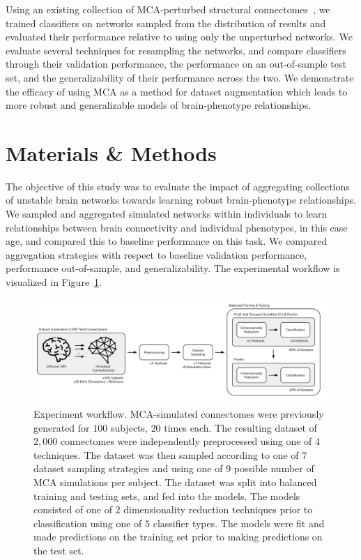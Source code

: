 \documentclass[num-refs]{nbdt-article}
\begin{document}
Using an existing collection of MCA-perturbed structural connectomes~\cite{Kiar2020-yz}, we trained classifiers on networks sampled from the distribution of results and evaluated their performance relative to using only the unperturbed networks. We evaluate several techniques for resampling the networks, and compare classifiers through their validation performance, the performance on an out-of-sample test set, and the generalizability of their performance across the two. We demonstrate the efficacy of using MCA as a method for dataset augmentation which leads to more robust and generalizable models of brain-phenotype relationships.

\section{Materials \& Methods}
The objective of this study was to evaluate the impact of aggregating collections of unstable brain networks towards learning robust brain-phenotype relationships. We sampled and aggregated simulated networks within individuals to learn relationships between brain connectivity and individual phenotypes, in this case age, and compared this to baseline performance on this task. We compared aggregation strategies with respect to baseline validation performance, performance out-of-sample, and generalizability. The experimental workflow is visualized in Figure~\ref{fig:workflow}.

\begin{figure}[bth!]\centering
\includegraphics[width=\linewidth]{figures/0.pdf}
\caption{Experiment workflow. MCA-simulated connectomes were previously generated for $100$ subjects, $20$ times each. The resulting dataset of $2,000$ connectomes were independently preprocessed using one of $4$ techniques. The dataset was then sampled according to one of $7$ dataset sampling strategies and using one of $9$ possible number of MCA simulations per subject. The dataset was split into balanced training and testing sets, and fed into the models. The models consisted of one of $2$ dimensionality reduction techniques prior to classification using one of $5$ classifier types. The models were fit and made predictions on the training set prior to making predictions on the test set.}
\label{fig:workflow}
\end{figure}
\end{document}
